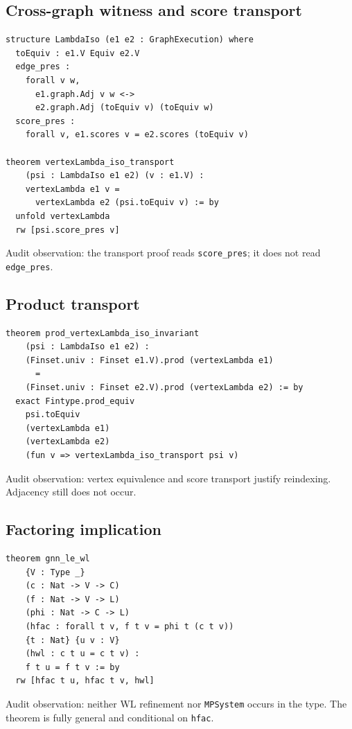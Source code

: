 \documentclass[10pt,letterpaper]{article}
\theoremstyle{definition}
\begin{document}
\subsection{Cross-graph witness and score transport}
\begin{lstlisting}[language={}]
structure LambdaIso (e1 e2 : GraphExecution) where
  toEquiv : e1.V Equiv e2.V
  edge_pres :
    forall v w,
      e1.graph.Adj v w <->
      e2.graph.Adj (toEquiv v) (toEquiv w)
  score_pres :
    forall v, e1.scores v = e2.scores (toEquiv v)

theorem vertexLambda_iso_transport
    (psi : LambdaIso e1 e2) (v : e1.V) :
    vertexLambda e1 v =
      vertexLambda e2 (psi.toEquiv v) := by
  unfold vertexLambda
  rw [psi.score_pres v]
\end{lstlisting}
Audit observation: the transport proof reads \texttt{score\_pres}; it does not
read \texttt{edge\_pres}.

\subsection{Product transport}
\begin{lstlisting}[language={}]
theorem prod_vertexLambda_iso_invariant
    (psi : LambdaIso e1 e2) :
    (Finset.univ : Finset e1.V).prod (vertexLambda e1)
      =
    (Finset.univ : Finset e2.V).prod (vertexLambda e2) := by
  exact Fintype.prod_equiv
    psi.toEquiv
    (vertexLambda e1)
    (vertexLambda e2)
    (fun v => vertexLambda_iso_transport psi v)
\end{lstlisting}
Audit observation: vertex equivalence and score transport justify reindexing.
Adjacency still does not occur.

\subsection{Factoring implication}
\begin{lstlisting}[language={}]
theorem gnn_le_wl
    {V : Type _}
    (c : Nat -> V -> C)
    (f : Nat -> V -> L)
    (phi : Nat -> C -> L)
    (hfac : forall t v, f t v = phi t (c t v))
    {t : Nat} {u v : V}
    (hwl : c t u = c t v) :
    f t u = f t v := by
  rw [hfac t u, hfac t v, hwl]
\end{lstlisting}
Audit observation: neither WL refinement nor \texttt{MPSystem} occurs in the
type. The theorem is fully general and conditional on \texttt{hfac}.
\end{document}
